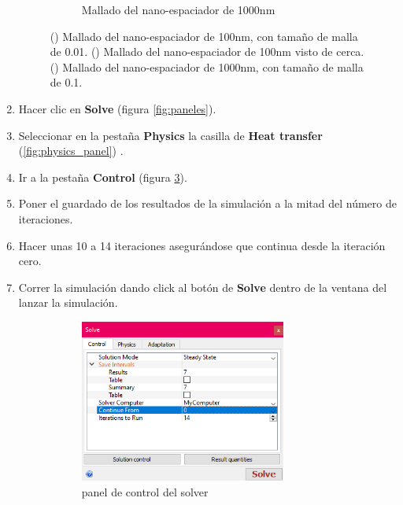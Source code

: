 \begin{enumerate}
\begin{figure}[h]
\begin{subfigure}[b]{0.3\textwidth}
		\caption{Mallado del nano-espaciador de 1000nm}
		\label{fig:mallado_1000_cerca_metodos}
	\end{subfigure}
	\caption{() Mallado del nano-espaciador de 100nm, con tamaño de malla de 0.01. () Mallado del nano-espaciador de 100nm visto de cerca. () Mallado del nano-espaciador de 1000nm, con tamaño de malla de 0.1.}
	\label{fig:mallados_metodos}
\end{figure} 
	\item Hacer clic en \textbf{Solve} (figura \ref{fig:paneles}).
	\item Seleccionar en la pestaña \textbf{Physics} la casilla de \textbf{Heat transfer} (\ref{fig:physics_panel}) .
	\item Ir a la pestaña \textbf{Control} (figura \ref{fig:control_panel}).
	\item Poner el guardado de los resultados de la simulación a la mitad del número de iteraciones.
	\item Hacer unas 10 a 14 iteraciones asegurándose que continua desde la iteración cero.
	\item Correr la simulación dando click al botón de \textbf{Solve} dentro de la ventana del lanzar la simulación.
	\begin{figure}[h]
		\centering
		\begin{subfigure}[b]{0.48\textwidth}
			\centering
			\includegraphics[width=0.8\textwidth]{figuras/Procedimiento_Simulaciones/Conduccion/control_panel.png}
			\caption{panel de control del solver}
			\label{fig:control_panel}
		\end{subfigure}
	  \hfill
		\begin{subfigure}[b]{0.48\textwidth}

\end{subfigure}
\end{figure}
\end{enumerate}
